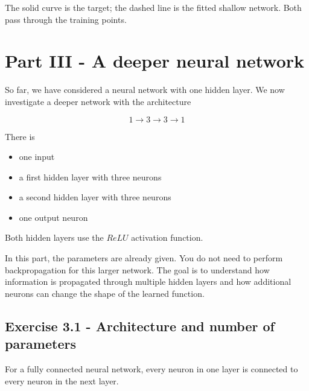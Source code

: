 \documentclass[10pt]{article}
\begin{document}
The solid curve is the target; the dashed line is the fitted shallow network. Both pass through the training points.
\begin{center}
\end{center}
\par\endgroup

\clearpage
\section*{Part III - A deeper neural network}
So far, we have considered a neural network with one hidden layer. We now investigate a deeper network with the architecture

\[
1\rightarrow3\rightarrow3\rightarrow1
\]

There is

\begin{itemize}
\item
one input

\item
a first hidden layer with three neurons

\item
a second hidden layer with three neurons

\item
one output neuron

\end{itemize}
Both hidden layers use the $ReLU$ activation function.

In this part, the parameters are already given. You do not need to perform backpropagation for this larger network. The goal is to understand how information is propagated through multiple hidden layers and how additional neurons can change the shape of the learned function.

\subsection*{Exercise 3.1 - Architecture and number of parameters}
For a fully connected neural network, every neuron in one layer is connected to every neuron in the next layer.
\end{document}
